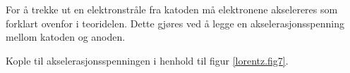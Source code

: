 \documentclass[../Elmag-labhefte-2020.tex]{subfiles}
\begin{document}


For å trekke ut en elektronstråle fra katoden må elektronene akselereres som forklart ovenfor i teoridelen. Dette gjøres ved å legge en akselerasjonsspenning mellom katoden og anoden. 

{\itsf Kople til akselerasjonsspenningen i henhold til figur \ref{lorentz.fig7}}.%
\end{document}
